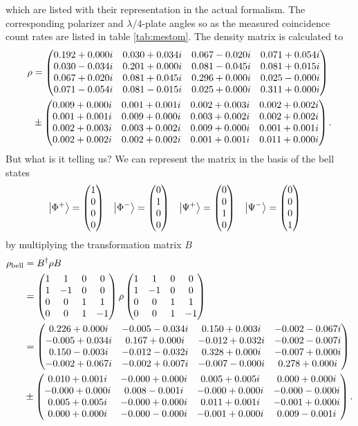 which are listed with their representation in the actual formalism.
The corresponding polarizer and $\lambda/4$-plate angles so as the measured coincidence count rates are listed in table \vref{tab:mestom}.
The density matrix is calculated to
\begin{align*}
\rho
    &=\rhonormal\\
    &\pm \drhonormal .
\end{align*}
But what is it telling us?
We can represent the matrix in the basis of the bell states
\begin{align}
\ket{\Phi^{+}}
    &=\begin{pmatrix}1\\0\\0\\0\end{pmatrix}
    &\ket{\Phi^{-}}
    &=\begin{pmatrix}0\\1\\0\\0\end{pmatrix}
    &\ket{\Psi^{+}}
    &=\begin{pmatrix}0\\0\\1\\0\end{pmatrix}
    &\ket{\Psi^{-}}
    &=\begin{pmatrix}0\\0\\0\\1\end{pmatrix}
    \label{eq:a:bell_basis}
\end{align}
by multiplying the transformation matrix $B$
\begin{align}
\rho_\text{bell}
    &=B^\dagger \rho B
    \label{eq:a:rho_bell}\\
    &=\begin{pmatrix}
    1&1&0&0\\
    1&-1&0&0\\
    0&0&1&1\\
    0&0&1&-1\\
    \end{pmatrix}
    \rho
    \begin{pmatrix}
    1&1&0&0\\
    1&-1&0&0\\
    0&0&1&1\\
    0&0&1&-1\\
    \end{pmatrix}
    \nonumber\\
    &=\rhobell
    \nonumber\\
    &\pm \drhobell .
    \nonumber
\end{align}
